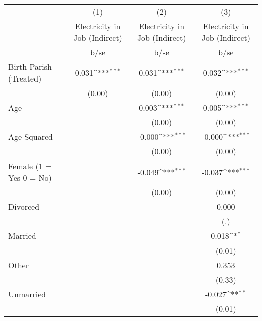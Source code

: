 {
\def\sym#1{\ifmmode^{#1}\else\(^{#1}\)\fi}
\begin{tabular}{l*{3}{c}}
\hline\hline
                    &\multicolumn{1}{c}{(1)}&\multicolumn{1}{c}{(2)}&\multicolumn{1}{c}{(3)}\\
                    &\multicolumn{1}{c}{Electricity in Job (Indirect)}&\multicolumn{1}{c}{Electricity in Job (Indirect)}&\multicolumn{1}{c}{Electricity in Job (Indirect)}\\
                    &        b/se         &        b/se         &        b/se         \\
\hline
Birth Parish (Treated)&       0.031\sym{***}&       0.031\sym{***}&       0.032\sym{***}\\
                    &      (0.00)         &      (0.00)         &      (0.00)         \\
Age                 &                     &       0.003\sym{***}&       0.005\sym{***}\\
                    &                     &      (0.00)         &      (0.00)         \\
Age Squared         &                     &      -0.000\sym{***}&      -0.000\sym{***}\\
                    &                     &      (0.00)         &      (0.00)         \\
Female (1 = Yes 0 = No)&                     &      -0.049\sym{***}&      -0.037\sym{***}\\
                    &                     &      (0.00)         &      (0.00)         \\
Divorced            &                     &                     &       0.000         \\
                    &                     &                     &         (.)         \\
Married             &                     &                     &       0.018\sym{*}  \\
                    &                     &                     &      (0.01)         \\
Other               &                     &                     &       0.353         \\
                    &                     &                     &      (0.33)         \\
Unmarried           &                     &                     &      -0.027\sym{**} \\
                    &                     &                     &      (0.01)         \\

\end{tabular}}
